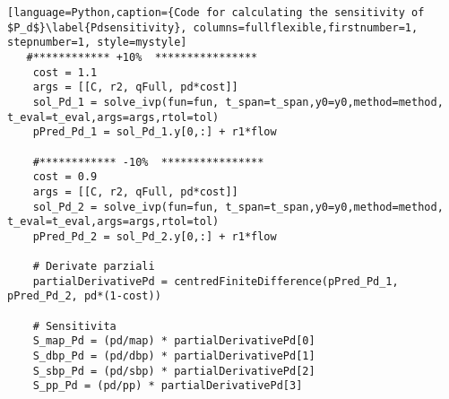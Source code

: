 \begin{lstlisting}[language=Python,caption={Code for calculating the sensitivity of $P_d$}\label{Pdsensitivity}, columns=fullflexible,firstnumber=1, stepnumber=1, style=mystyle]
   #************ +10%  ****************
    cost = 1.1
    args = [[C, r2, qFull, pd*cost]]
    sol_Pd_1 = solve_ivp(fun=fun, t_span=t_span,y0=y0,method=method, t_eval=t_eval,args=args,rtol=tol)
    pPred_Pd_1 = sol_Pd_1.y[0,:] + r1*flow
    
    #************ -10%  ****************
    cost = 0.9
    args = [[C, r2, qFull, pd*cost]]
    sol_Pd_2 = solve_ivp(fun=fun, t_span=t_span,y0=y0,method=method, t_eval=t_eval,args=args,rtol=tol)
    pPred_Pd_2 = sol_Pd_2.y[0,:] + r1*flow
    
    # Derivate parziali
    partialDerivativePd = centredFiniteDifference(pPred_Pd_1, pPred_Pd_2, pd*(1-cost))
    
    # Sensitivita
    S_map_Pd = (pd/map) * partialDerivativePd[0]
    S_dbp_Pd = (pd/dbp) * partialDerivativePd[1]
    S_sbp_Pd = (pd/sbp) * partialDerivativePd[2]
    S_pp_Pd = (pd/pp) * partialDerivativePd[3]
\end{lstlisting}